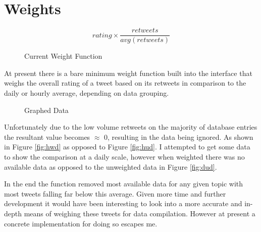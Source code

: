 \documentclass[12pt,a4paper]{report}
\begin{document}
  \section{Weights}
  \begin{figure}
    \[rating \times \frac{retweets}{avg(retweets)}\]
    \caption{Current Weight Function}
  \end{figure}
  At present there is a bare minimum weight function built into the interface that weighs the overall rating of a tweet based on its retweets in comparison to the daily or hourly average, depending on data grouping.
  \par
  \begin{figure}[h]
    \centering
    \caption{Graphed Data}
    \label{fig:gd}
  \end{figure}
  Unfortunately due to the low volume retweets on the majority of database entries the resultant value becomes $\approx$ 0, resulting in the data being ignored. As shown in Figure \ref{fig:hwd} as opposed to Figure \ref{fig:hud}. I attempted to get some data to show the comparison at a daily scale, however when weighted there was no available data as opposed to the unweighted data in Figure \ref{fig:dud}.
  \par
  In the end the function removed most available data for any given topic with most tweets falling far below this average. Given more time and further development it would have been interesting to look into a more accurate and in-depth means of weighing these tweets for data compilation. However at present a concrete implementation for doing so escapes me.
\end{document}
